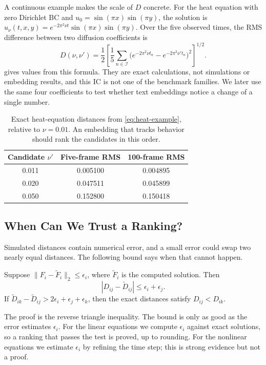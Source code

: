 A continuous example makes the scale of $D$ concrete. For the heat equation with zero Dirichlet BC and $u_0=\sin(\pi x)\sin(\pi y)$, the solution is $u_\nu(t,x,y)=e^{-2\pi^2\nu t}\sin(\pi x)\sin(\pi y)$. Over the five observed times, the RMS difference between two diffusion coefficients is
\begin{equation}
 D(\nu,\nu')=\frac12
 \left[\frac15\sum_{n\in\mathcal I}
 \big(e^{-2\pi^2\nu t_n}-e^{-2\pi^2\nu't_n}\big)^2
 \right]^{1/2}.
\label{eq:heat-example}
\end{equation}
 gives values from this formula. They are exact calculations, not simulations or embedding results, and this IC is not one of the benchmark families. We later use the same four coefficients to test whether text embeddings notice a change of a single number.

\begin{table}[t]
\centering
\caption{Exact heat-equation distances from \cref{eq:heat-example}, relative to $\nu=0.01$. An embedding that tracks behavior should rank the candidates in this order.}
\label{tab:calibration}
\begin{tabular}{ccc}
\toprule
Candidate $\nu'$ & Five-frame RMS & 100-frame RMS \\
\midrule
0.011 & 0.005100 & 0.004895 \\
0.020 & 0.047511 & 0.045899 \\
0.050 & 0.152800 & 0.150418 \\
\bottomrule
\end{tabular}
\end{table}

\subsection{When Can We Trust a Ranking?}
Simulated distances contain numerical error, and a small error could swap two nearly equal distances. The following bound says when that cannot happen.
\begin{proposition}
Suppose $\|F_i-\widetilde F_i\|_2\le\epsilon_i$, where $\widetilde F_i$ is the computed solution. Then
\begin{equation}
 |D_{ij}-\widetilde D_{ij}|\le\epsilon_i+\epsilon_j.
\end{equation}
If $\widetilde D_{ik}-\widetilde D_{ij}>2\epsilon_i+\epsilon_j+\epsilon_k$, then the exact distances satisfy $D_{ij}<D_{ik}$.
\label{prop:margin}
\end{proposition}
The proof is the reverse triangle inequality. The bound is only as good as the error estimates $\epsilon_i$. For the linear equations we compute $\epsilon_i$ against exact solutions, so a ranking that passes the test is proved, up to rounding. For the nonlinear equations we estimate $\epsilon_i$ by refining the time step; this is strong evidence but not a proof.

